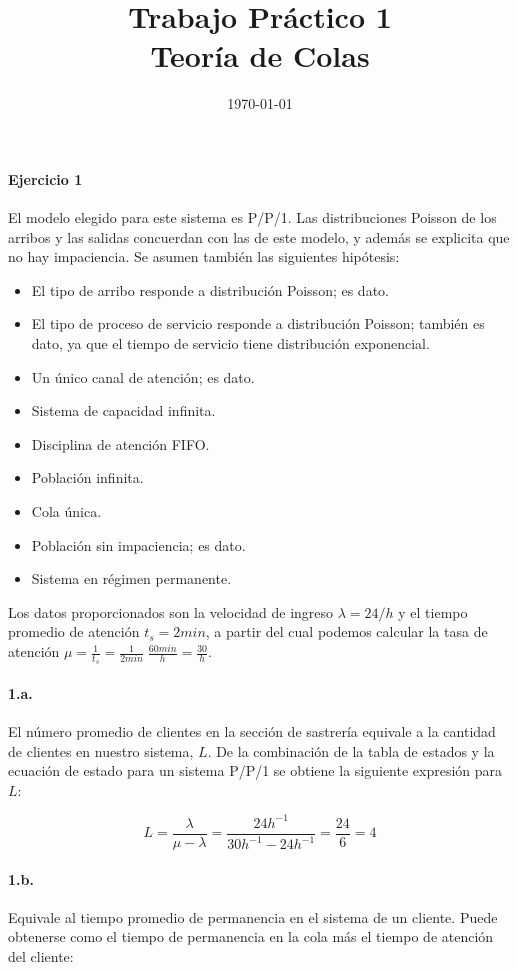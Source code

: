 \documentclass{article}
\title{Trabajo Práctico 1\\Teoría de Colas}
\author{}
\date{\today}
\begin{document}
\maketitle

\paragraph{Ejercicio 1}
    El modelo elegido para este sistema es P/P/1. Las distribuciones Poisson de los arribos y las salidas concuerdan con las de este modelo, y además se explicita que no hay impaciencia. Se asumen también las siguientes hipótesis:
    \begin{itemize}
        \item El tipo de arribo responde a distribución Poisson; es dato.
        \item El tipo de proceso de servicio responde a distribución Poisson; también es dato, ya que el tiempo de servicio tiene distribución exponencial. 
        \item Un único canal de atención; es dato.
        \item Sistema de capacidad infinita.
        \item Disciplina de atención FIFO.
        \item Población infinita.
        \item Cola única.
        \item Población sin impaciencia; es dato.
        \item Sistema en régimen permanente.
    \end{itemize}
    
    Los datos proporcionados son la velocidad de ingreso $ \lambda = 24/h $ y el tiempo promedio de atención $ t_s = 2 min $, a partir del cual podemos calcular la tasa de atención $ \mu = \frac{1}{t_s} = \frac{1}{2min} \; \frac{60min}{h} = \frac{30}{h} $.

    \paragraph{1.a.} El número promedio de clientes en la sección de sastrería equivale a la cantidad de clientes en nuestro sistema, $ L $. De la combinación de la tabla de estados y la ecuación de estado para un sistema P/P/1 se obtiene la siguiente expresión para $ L $:

    $$ L = \frac{\lambda}{\mu - \lambda} = \frac{24 h^{-1}}{30 h^{-1} - 24 h^{-1}} = \frac{24}{6} = 4 $$

    \paragraph{1.b.} Equivale al tiempo promedio de permanencia en el sistema de un cliente. Puede obtenerse como el tiempo de permanencia en la cola más el tiempo de atención del cliente:
    
\end{document}
